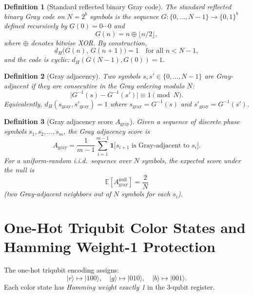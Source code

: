 \documentclass[11pt]{article}
\newtheorem{definition}{Definition}
\begin{document}
\begin{definition}[Standard reflected binary Gray code]
The \emph{standard reflected binary Gray code} on $N = 2^b$ symbols is the
sequence $G : \{0,\dots,N{-}1\} \to \{0,1\}^b$ defined recursively by
$G(0) = 0\cdots0$ and
\[
  G(n) = n \oplus \lfloor n/2 \rfloor,
\]
where $\oplus$ denotes bitwise XOR. By construction,
\[
  d_H\bigl(G(n),\, G(n{+}1)\bigr) = 1 \quad \text{for all } n < N{-}1,
\]
and the code is cyclic: $d_H(G(N{-}1), G(0)) = 1$.
\end{definition}

\begin{definition}[Gray adjacency]
Two symbols $s, s' \in \{0,\dots,N{-}1\}$ are \emph{Gray-adjacent} if they are
consecutive in the Gray ordering modulo $N$:
\[
  \bigl|G^{-1}(s) - G^{-1}(s')\bigr| \equiv 1 \pmod{N}.
\]
Equivalently, $d_H(s_{\mathrm{gray}}, s'_{\mathrm{gray}}) = 1$ where
$s_{\mathrm{gray}} = G^{-1}(s)$ and $s'_{\mathrm{gray}} = G^{-1}(s')$.
\end{definition}

\begin{definition}[Gray adjacency score $A_{\mathrm{gray}}$]
Given a sequence of discrete phase symbols $s_1, s_2, \dots, s_m$, the
\emph{Gray adjacency score} is
\[
  A_{\mathrm{gray}} = \frac{1}{m-1}\sum_{i=1}^{m-1}
    \mathbf{1}\bigl[s_{i+1} \text{ is Gray-adjacent to } s_i\bigr].
\]
For a uniform-random i.i.d.\ sequence over $N$ symbols, the expected score
under the null is
\[
  \mathbb{E}[A_{\mathrm{gray}}^{\mathrm{null}}] = \frac{2}{N}
\]
(two Gray-adjacent neighbors out of $N$ symbols for each $s_i$).
\end{definition}

\section{One-Hot Triqubit Color States and Hamming Weight-1 Protection}

The one-hot triqubit encoding assigns:
\[
  |r\rangle \mapsto |100\rangle, \quad
  |g\rangle \mapsto |010\rangle, \quad
  |b\rangle \mapsto |001\rangle.
\]
Each color state has \emph{Hamming weight exactly 1} in the 3-qubit register.
\end{document}
